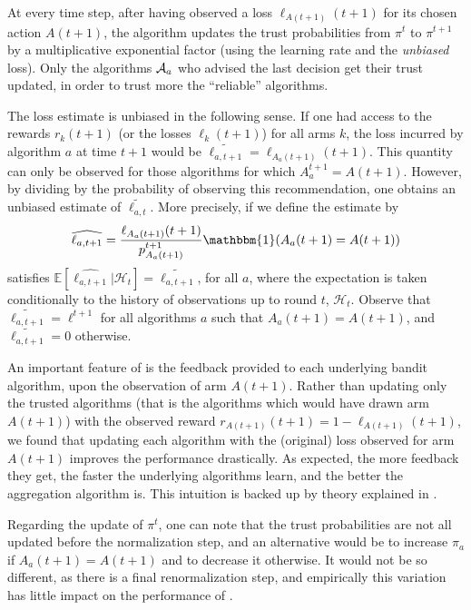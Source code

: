 At every time step, after having observed a loss $\ell_{A(t+1)}(t+1)$ for its chosen action $A(t+1)$,
the algorithm updates the trust probabilities from $\pi^t$ to $\pi^{t+1}$ by
a multiplicative exponential factor (using the learning rate and the \emph{unbiased} loss).
%
Only the algorithms $\mathcal{A}_a$ who advised the last decision get their trust updated, in order to trust more the ``reliable'' algorithms.

The loss estimate is unbiased in the following sense. If one had access to the rewards $r_k(t+1)$ (or the losses $\ell_k(t+1)$) for all arms $k$, the loss incurred by algorithm $a$ at time $t+1$ would be $\widetilde{\ell_{a,t+1}} = \ell_{A_a(t+1)}(t+1)$. This quantity can only be observed for those algorithms for which $A_{a}^{t+1}=A(t+1)$. However, by dividing by the probability of observing this recommendation, one obtains an unbiased estimate of $\widetilde{\ell_{a,t}}$. More precisely, if we define the estimate by
\begin{equation}
	\widehat{\ell_{a,t+1}} = \frac{\ell_{A_a(t+1)}(t+1)}{p_{A_a(t+1)}^{t+1}} \mathbbm{1}(A_a(t+1) = A(t+1))
\end{equation}
satisfies $\mathbb{E}[\widehat{\ell_{a,t+1}} | \mathcal{H}_t] = \widetilde{\ell_{a,t+1}}$, for all $a$, where the expectation is taken conditionally to the history of observations up to round $t$, $\mathcal{H}_{t}$. Observe that $\widetilde{\ell_{a,t+1}}=\ell^{t+1}$ for all algorithms $a$ such that $A_a(t+1)=A(t+1)$, and $\widetilde{\ell_{a,t+1}}=0$ otherwise.


An important feature of \Aggr{} is the feedback provided to each underlying bandit algorithm, upon the observation of arm $A(t+1)$. Rather than updating only the trusted algorithms (that is the algorithms which would have drawn arm $A(t+1)$) with the observed reward $r_{A(t+1)}(t+1)=1 - \ell_{A(t+1)}(t+1)$,  we found that updating each algorithm with the (original) loss observed for arm $A(t+1)$ improves the performance drastically.
%
As expected, the more feedback they get, the faster the underlying algorithms learn, and the better the aggregation algorithm is.
This intuition is backed up by theory explained in \cite{Maillard11}.


Regarding the update of $\pi^t$, one can note that the trust probabilities are not all updated before the normalization step,
and an alternative would be to
increase $\pi_{a}$ if $A_a(t+1) = A(t+1)$ and to decrease it otherwise.
It would not be so different, as there is a final renormalization step, and empirically this variation has little impact on the performance of \Aggr{}.



